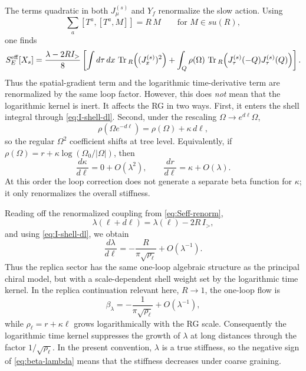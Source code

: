 \documentclass[aps,prx,preprint,amsmath,amssymb]{revtex4-2}
\newcommand{\Tr}{{\rm \, Tr\,}}
\begin{document}
The terms quadratic in both \(J_\mu^{(s)}\) and \(Y_f\) renormalize the slow
action.  Using
\begin{equation}
\sum_a [T^a,[T^a,M]] = R\,M
\qquad
\text{for } M\in su(R),
\end{equation}
one finds
\begin{equation}\label{eq:Seff-renorm}
S_E^{\rm eff}[X_s]
=
\frac{\lambda-2RI_>}{8}
\left[
\int d\tau\,dx\,\Tr_R\!\left((J_x^{(s)})^2\right)
+\int_Q \rho(\Omega)\,
\Tr_R\!\left(J_\tau^{(s)}(-Q)J_\tau^{(s)}(Q)\right)
\right].
\end{equation}
Thus the spatial-gradient term and the logarithmic time-derivative term are
renormalized by the same loop factor.  However, this does \emph{not} mean that
the logarithmic kernel is inert.  It affects the RG in two ways.  First, it
enters the shell integral through \eqref{eq:I-shell-dl}.  Second, under the
rescaling \(\Omega\to e^{d\ell}\Omega\),
\begin{equation}\label{eq:rho-rescale}
\rho\!\left(\Omega e^{-d\ell}\right)
=
\rho(\Omega)+\kappa\,d\ell,
\end{equation}
so the regular \(\Omega^2\) coefficient shifts at tree level.  Equivalently, if
\(\rho(\Omega)=r+\kappa\log(\Omega_0/|\Omega|)\), then
\begin{equation}\label{eq:r-kappa-flow}
\frac{d\kappa}{d\ell}=0+O(\lambda^2),
\qquad
\frac{dr}{d\ell}=\kappa+O(\lambda).
\end{equation}
At this order the loop correction does not generate a separate beta function for
\(\kappa\); it only renormalizes the overall stiffness.

Reading off the renormalized coupling from \eqref{eq:Seff-renorm},
\begin{equation}
\lambda(\ell+d\ell)
=
\lambda(\ell)-2R\,I_>,
\end{equation}
and using \eqref{eq:I-shell-dl}, we obtain
\begin{equation}\label{eq:beta-lambda}
\frac{d\lambda}{d\ell}
=
-\frac{R}{\pi\sqrt{\rho_\ell}}
+O(\lambda^{-1}).
\end{equation}
Thus the replica sector has the same one-loop algebraic structure as the
principal chiral model, but with a scale-dependent shell weight set by the
logarithmic time kernel.  In the replica continuation relevant here,
\(R\to 1\), the one-loop flow is
\begin{equation}
\beta_\lambda
=
-\frac{1}{\pi\sqrt{\rho_\ell}}
+O(\lambda^{-1}),
\end{equation}
while \(\rho_\ell=r+\kappa\ell\) grows logarithmically with the RG scale.
Consequently the logarithmic time kernel suppresses the growth of \(\lambda\) at
long distances through the factor \(1/\sqrt{\rho_\ell}\).  In the present
convention, \(\lambda\) is a true stiffness, so the negative sign of
\eqref{eq:beta-lambda} means that the stiffness decreases under coarse graining.
\end{document}
